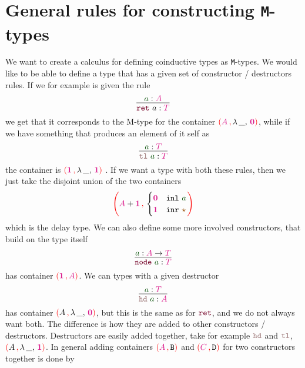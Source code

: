 \documentclass[twoside,11pt,openright]{report}
\theoremstyle{plain} %
\theoremstyle{definition}
\theoremstyle{remark}
\newcommand*{\term}[1]{\textcolor{green!30!black}{#1}} %
\newcommand*{\type}[1]{\textcolor{magenta!90!black}{#1}}
\newcommand*{\containerpair}[2]{\ensuremath{\colorlet{savedleftcolor}{.}\color{red}\left(\color{savedleftcolor}#1\,\textcolor{red}{\mathbf{,}}\,#2\color{red}\right)\color{savedleftcolor}}}
\newcommand*{\containerpairsimple}[2]{\containerpair{#1}{\lambda\,\_,\,#2}}
\newcommand*{\unit}{\type{\textbf{1}}}
\newcommand*{\empt}{\type{\textbf{0}}}
\newcommand*{\constant}[1]{\textcolor{orange!60!black}{\ensuremath{\mathtt{#1}}}}
\newcommand*{\constructor}[1]{\textcolor{purple!60!black}{\ensuremath{\mathtt{#1}}}}
\newcommand*{\destructor}[1]{\textcolor{pink!60!black}{\ensuremath{\mathtt{#1}}}}
\newcommand*{\typeformer}[1]{\ensuremath{\mathtt{#1}}}
\newcommand*{\unitelem}{\constant{\star}} %
\begin{document}
\section{General rules for constructing \texttt{M}-types}
We want to create a calculus for defining coinductive types as \texttt{M}-types. We would like to be able to define a type that has a given set of constructor / destructors rules. If we for example is given the rule
\begin{equation}
  \vcenter{\infer{\constructor{ret}~a : \type{T}}{\term{a} : \type{A}}}
\end{equation}
we get that it corresponds to the M-type for the container \(\containerpairsimple{\type{A}}{\empt}\), while if we have something that produces an element of it self as
\begin{equation}
  \vcenter{\infer{\destructor{tl}~\term{a} : \type{T}}{\term{a} : \type{T}}}
\end{equation}
the container is \(\containerpairsimple{\unit}{\unit}\) . If we want a type with both these rules, then we just take the disjoint union of the two containers
\begin{equation}
  \containerpair{\type{A} + \unit}{\begin{cases} \empt & \mathtt{inl}~\term{a} \\ \unit & \mathtt{inr}~\unitelem \end{cases}}
\end{equation}
which is the delay type. We can also define some more involved constructors, that build on the type itself
\begin{equation}
  \vcenter{\infer{\constructor{node}~\term{a} : \type{T}}{\term{a} : \type{A} \rightarrow \type{T}}}
\end{equation}
has container \(\containerpair{\unit}{\type{A}}\). We can types with a given destructor
\begin{equation}
  \vcenter{\infer{\destructor{hd}~\term{a} : \type{A}}{\term{a} : \type{T}}}
\end{equation}
has container \(\containerpairsimple{A}{\empt}\), but this is the same as for \(\constructor{ret}\), and we do not always want both. The difference is how they are added to other constructors / destructors. Destructors are easily added together, take for example \(\destructor{hd}\) and \(\destructor{tl}\), \(\containerpairsimple{A}{\unit}\). In general adding containers \(\containerpair{\type{A}}{\typeformer{B}}\) and \(\containerpair{\type{C}}{\typeformer{D}}\) for two constructors together is done by
\end{document}
